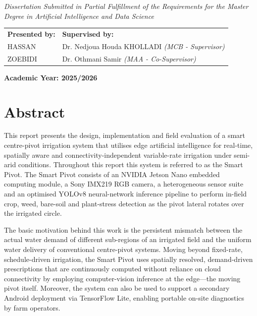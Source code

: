 \documentclass[12pt,a4paper]{report}
\begin{document}
\vspace{0.3cm} %

\begin{center}
    \textit{Dissertation Submitted in Partial Fulfillment of the Requirements for the Master}\\
    \textit{Degree in Artificial Intelligence and Data Science}
\end{center}

\vspace{0.3cm} %

\noindent
\begin{tabular}{p{7cm} p{7cm}}
    \textbf{Presented by:} & \textbf{Supervised by:} \\
    HASSAN & Dr. Nedjoua Houda KHOLLADI \hfill \textit{(MCB - Supervisor)} \\
    ZOEBIDI            & Dr. Othmani Samir \hfill \textit{(MAA - Co-Supervisor)} \\
\end{tabular}


\vspace{0.3cm} %

\begin{center}
    \textbf{\Large Academic Year: 2025/2026}
\end{center}
\newpage
\section*{Abstract}
This report presents the design, implementation and field evaluation of a smart centre-pivot irrigation system that utilises edge artificial intelligence for real-time, spatially aware and connectivity-independent variable-rate irrigation under semi-arid conditions. Throughout this report this system is referred to as the Smart Pivot. The Smart Pivot consists of an NVIDIA Jetson Nano embedded computing module, a Sony IMX219 RGB camera, a heterogeneous sensor suite and an optimised YOLOv8 neural-network inference pipeline to perform in-field crop, weed, bare-soil and plant-stress detection as the pivot lateral rotates over the irrigated circle.

The basic motivation behind this work is the persistent mismatch between the actual water demand of different sub-regions of an irrigated field and the uniform water delivery of conventional centre-pivot systems. Moving beyond fixed-rate, schedule-driven irrigation, the Smart Pivot uses spatially resolved, demand-driven prescriptions that are continuously computed without reliance on cloud connectivity by employing computer-vision inference at the edge---the moving pivot itself. Moreover, the system can also be used to support a secondary Android deployment via TensorFlow Lite, enabling portable on-site diagnostics by farm operators.
\end{document}
